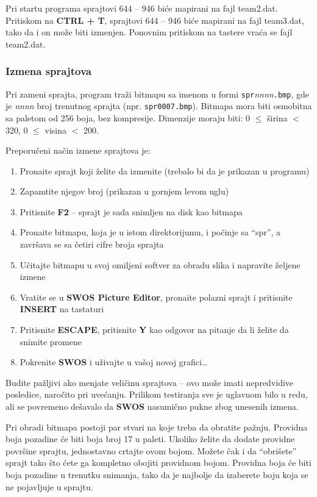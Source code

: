 \documentclass[a4paper,12pt]{article}
\begin{document}
Pri startu programa sprajtovi 644 -- 946 bi\'ce mapirani na fajl team2.dat. Pritiskom na
{\bf CTRL + T}, sprajtovi 644 -- 946 bi\'ce mapirani na fajl team3.dat, tako da
i on mo\v ze biti izmenjen. Ponovnim pritiskom na tastere vra\'ca se fajl
team2.dat.

\subsubsection{Izmena sprajtova}

Pri zameni sprajta, program tra\v zi bitmapu sa imenom u formi \verb|spr|{\it nnnn}\verb|.bmp|, gde je
{\it nnnn} broj trenutnog sprajta (npr. \verb|spr0007.bmp|). Bitmapa mora biti osmobitna sa paletom od 256 boja,
bez kompresije. Dimenzije moraju biti: 0 $\le$ \v sirina $<$ 320, 0 $\le$ visina $<$ 200.

Preporu\v ceni na\v cin izmene sprajtova je:

\begin{enumerate}
\item Prona\dj ite sprajt koji \v zelite da izmenite (trebalo bi da je prikazan u programu)
\item Zapamtite njegov broj (prikazan u gornjem levom uglu)
\item Pritisnite {\bf F2} -- sprajt je sada snimljen na disk kao bitmapa
\item Prona\dj ite bitmapu, koja je u istom direktorijumu, i po\v cinje sa ``spr'', a zavr\v sava se sa
\v cetiri cifre broja sprajta
\item U\v citajte bitmapu u svoj omiljeni softver za obradu slika i napravite \v zeljene izmene
\item Vratite se u {\bf SWOS Picture Editor}, prona\dj ite polazni sprajt i pritisnite {\bf INSERT} na tastaturi
\item Pritisnite {\bf ESCAPE}, pritisnite {\bf Y} kao odgovor na pitanje da li \v zelite da snimite promene
\item Pokrenite {\bf SWOS} i u\v zivajte u va\v soj novoj grafici\ldots
\end{enumerate}

Budite pa\v zljivi ako menjate veli\v cinu sprajtova -- ovo mo\v ze imati nepredvidive posledice, naro\v cito pri
uve\'canju. Prilikom testiranja sve je uglavnom bilo u redu, ali se povremeno de\v savalo da {\bf SWOS}
nasumi\v cno pukne zbog unesenih izmena.

Pri obradi bitmapa postoji par stvari na koje treba da obratite pa\v znju. Providna boja pozadine \'ce biti boja
broj 17 u paleti. Ukoliko \v zelite da dodate providne povr\v sine sprajtu, jednostavno crtajte ovom bojom.
Mo\v zete \v cak i da ``obri\v sete'' sprajt tako \v sto \'cete ga kompletno obojiti providnom bojom.
Providna boja \'ce biti boja pozadine u trenutku snimanja, tako da je najbolje da izaberete boju koja se ne
pojavljuje u sprajtu.
\end{document}
